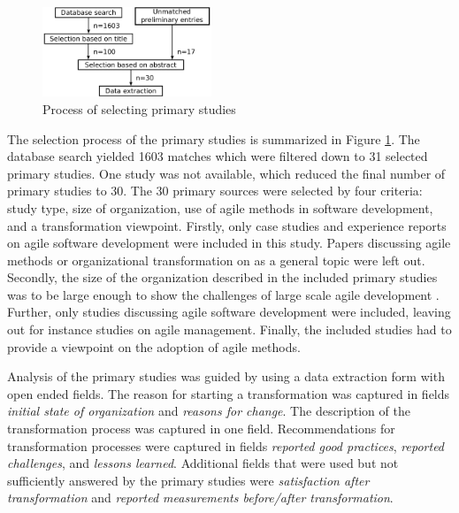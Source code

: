 \documentclass[lnbip]{svmultln}
\begin{document}
\begin{figure}[b]
  \begin{center}
    \includegraphics[width=0.45\textwidth]{researchprocess}
    \caption{Process of selecting primary studies}
    \label{fig:selection_process}
  \end{center}
\end{figure}

The selection process of the primary studies is summarized in Figure
\ref{fig:selection_process}. The database search yielded 1603 matches which were
filtered down to 31 selected primary studies. One study was not available, which
reduced the final number of primary studies to 30.
The 30 primary sources were selected by four criteria: study type, size of
organization, use of agile methods in software development, and a transformation
viewpoint. Firstly, only case studies and experience reports on agile software
development were included in this study. Papers discussing agile methods or
organizational transformation on as a general topic were left out. Secondly, the
size of the organization described in the included primary studies was to be
large enough to show the challenges of large scale agile development
. Further, only studies discussing agile software
development were included, leaving out for instance studies on agile management.
Finally, the included studies had to provide a viewpoint on the adoption of
agile methods.


Analysis of the primary studies was guided by using a data extraction form with
open ended fields. The reason for starting a transformation was captured in
fields \textit{initial state of organization} and \textit{reasons for change}.
The description of the transformation process was captured in one field.
Recommendations for transformation processes were captured in fields
\textit{reported good practices}, \textit{reported challenges}, and
\textit{lessons learned}.
Additional fields that were used but not sufficiently answered by the primary
studies were \textit{satisfaction after transformation} and \textit{reported
measurements before/after transformation}.
\end{document}
